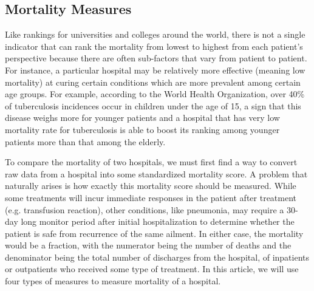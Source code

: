 \documentclass{article}
\begin{document}
\subsection{Mortality Measures}\label{sec:mortality_measures}
Like rankings for universities and colleges around the world, there is not a single indicator that can rank the mortality from lowest to highest from each patient's perspective because there are often sub-factors that vary from patient to patient. For instance, a particular hospital may be relatively more effective (meaning low mortality) at curing certain conditions which are more prevalent among certain age groups. For example, according to the World Health Organization, over 40\% of tuberculosis incidences occur in children under the age of 15, a sign that this disease weighs more for younger patients and a hospital that has very low mortality rate for tuberculosis is able to boost its ranking among younger patients more than that among the elderly.

To compare the mortality of two hospitals, we must first find a way to convert raw data from a hospital into some standardized mortality score. A problem that naturally arises is how exactly this mortality score should be measured. While some treatments will incur immediate responses in the patient after treatment (e.g. transfusion reaction), other conditions, like pneumonia, may require a 30-day long monitor period after initial hospitalization to determine whether the patient is safe from recurrence of the same ailment. In either case, the mortality would be a fraction, with the numerator being the number of deaths and the denominator being the total number of discharges from the hospital, of inpatients or outpatients who received some type of treatment. In this article, we will use four types of measures to measure mortality of a hospital.
\end{document}
